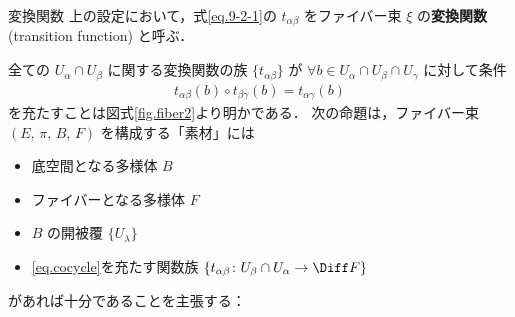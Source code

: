 \documentclass[geometry_main]{subfiles}
\begin{document}
\begin{mydef}[label=def.fiber_transform]{変換関数}
	上の設定において，式\eqref{eq.9-2-1}の $t_{\alpha\beta}$ をファイバー束 $\xi$ の\textbf{変換関数} (transition function) と呼ぶ．
\end{mydef}

全ての $U_\alpha \cap U_\beta$ に関する変換関数の族 $\{t_{\alpha\beta}\}$ が $\forall b \in U_\alpha \cap U_\beta \cap U_\gamma$ に対して条件
\begin{align}
	\label{eq.cocycle}
	t_{\alpha\beta}(b) \circ t_{\beta\gamma}(b) = t_{\alpha\gamma}(b)
\end{align}
を充たすことは図式\ref{fig.fiber2}より明かである．
次の命題は，ファイバー束 $(E,\, \pi,\, B,\, F)$ を構成する「素材」には
\begin{itemize}
	\item 底空間となる\cinfty 多様体 $B$
	\item ファイバーとなる\cinfty 多様体 $F$
	\item $B$ の開被覆 $\{ U_\lambda \}$
	\item \eqref{eq.cocycle}を充たす\cinfty 関数族 $\{t_{\alpha\beta} \colon U_\beta \cap U_\alpha \to \Diff F\}$
\end{itemize}
があれば十分であることを主張する：
\end{document}
